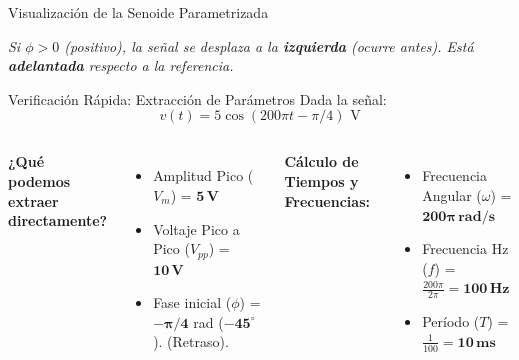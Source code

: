 \documentclass[aspectratio=169, 10pt]{beamer}
\begin{document}
\begin{frame}{Visualización de la Senoide Parametrizada}
    \begin{center}
    \end{center}
    \textit{Si $\phi > 0$ (positivo), la señal se desplaza a la \textbf{izquierda} (ocurre antes). Está \textbf{adelantada} respecto a la referencia.}
\end{frame}

\begin{frame}{Verificación Rápida: Extracción de Parámetros}
    Dada la señal: 
    $$v(t) = 5 \cos(200\pi t - \pi/4) \text{ V}$$
    
    \vspace{0.3cm}
    \begin{columns}[T]
        \textbf{¿Qué podemos extraer directamente?}
        \begin{itemize}
            \item Amplitud Pico ($V_m$) = $\mathbf{5\,\text{V}}$
            \item Voltaje Pico a Pico ($V_{pp}$) = $\mathbf{10\,\text{V}}$
            \item Fase inicial ($\phi$) = $\mathbf{-\pi/4}$ rad ($\mathbf{-45^\circ}$). (Retraso).
        \end{itemize}
        
        \textbf{Cálculo de Tiempos y Frecuencias:}
        \begin{itemize}
            \item Frecuencia Angular ($\omega$) = $\mathbf{200\pi\,\text{rad/s}}$
            \item Frecuencia Hz ($f$) = $\frac{200\pi}{2\pi} = \mathbf{100\,\text{Hz}}$
            \item Período ($T$) = $\frac{1}{100} = \mathbf{10\,\text{ms}}$
        \end{itemize}
    \end{columns}
\end{frame}
\end{document}

